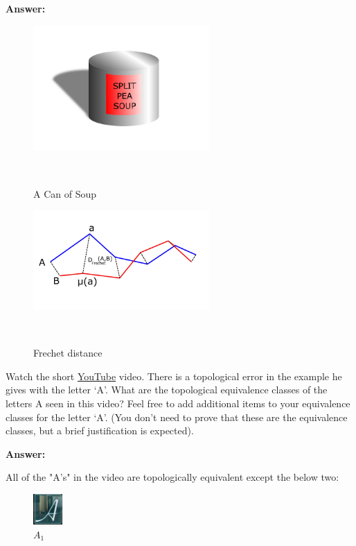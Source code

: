 \documentclass{article}
\begin{document}
\textbf{Answer:} 

\begin{figure}[h]
    \centering
    \includegraphics[width=0.60\textwidth]{can}
    \caption{A Can of Soup}
    \label{fig:A Can of Soup}~\cite{can}
\end{figure}

\begin{figure}[h]
    \centering
    \includegraphics[width=0.60\textwidth]{bitmap}
    \caption{Frechet distance}
    \label{fig:Frechet distance}~\cite{frechet}
\end{figure}


\nextprob{}
 Watch the short \href{https://www.ayasdi.com/resources/professor-gunnar-carlsson-introduces-topological-data-analysis/}{YouTube} video.
 There is a topological
 error in the example he gives with the letter `A'.  What are the topological equivalence
classes of the letters A seen in this video?  Feel free to add additional
items to your equivalence classes for the letter `A'.  (You don't need to prove
that these are the equivalence classes, but a brief justification is expected).

\textbf{Answer:} 

All of the "A's" in the video are topologically equivalent except the below two:

\begin{figure}[h]
    \centering
    \includegraphics[width=0.1\textwidth]{A1}
    \caption{$A_1$}
    \label{fig:$A_1$}
\end{figure}
\end{document}
